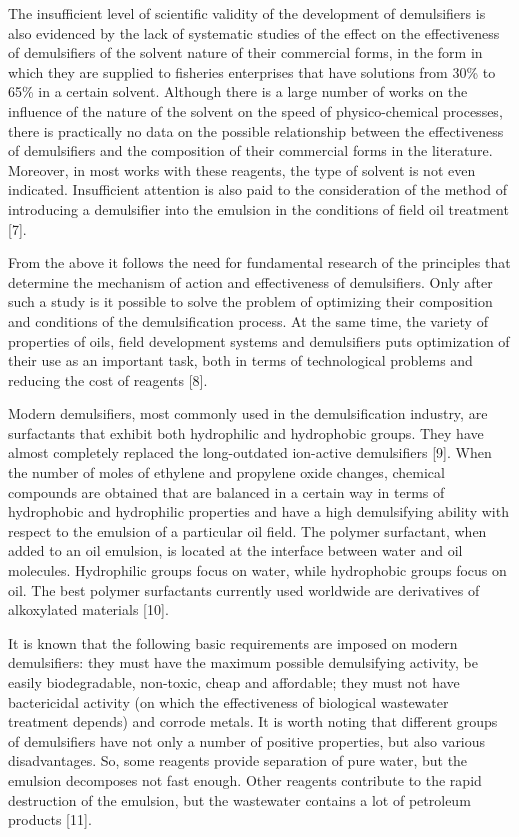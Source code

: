 The insufficient level of scientific validity of the development of
demulsifiers is also evidenced by the lack of systematic studies of the
effect on the effectiveness of demulsifiers of the solvent nature of
their commercial forms, in the form in which they are supplied to
fisheries enterprises that have solutions from 30\% to 65\% in a certain
solvent. Although there is a large number of works on the influence of
the nature of the solvent on the speed of physico-chemical processes,
there is practically no data on the possible relationship between the
effectiveness of demulsifiers and the composition of their commercial
forms in the literature. Moreover, in most works with these reagents,
the type of solvent is not even indicated. Insufficient attention is
also paid to the consideration of the method of introducing a
demulsifier into the emulsion in the conditions of field oil treatment
{[}7{]}.

From the above it follows the need for fundamental research of the
principles that determine the mechanism of action and effectiveness of
demulsifiers. Only after such a study is it possible to solve the
problem of optimizing their composition and conditions of the
demulsification process. At the same time, the variety of properties of
oils, field development systems and demulsifiers puts optimization of
their use as an important task, both in terms of technological problems
and reducing the cost of reagents {[}8{]}.

Modern demulsifiers, most commonly used in the demulsification industry,
are surfactants that exhibit both hydrophilic and hydrophobic groups.
They have almost completely replaced the long-outdated ion-active
demulsifiers {[}9{]}. When the number of moles of ethylene and propylene
oxide changes, chemical compounds are obtained that are balanced in a
certain way in terms of hydrophobic and hydrophilic properties and have
a high demulsifying ability with respect to the emulsion of a particular
oil field. The polymer surfactant, when added to an oil emulsion, is
located at the interface between water and oil molecules. Hydrophilic
groups focus on water, while hydrophobic groups focus on oil. The best
polymer surfactants currently used worldwide are derivatives of
alkoxylated materials {[}10{]}.

It is known that the following basic requirements are imposed on modern
demulsifiers: they must have the maximum possible demulsifying activity,
be easily biodegradable, non-toxic, cheap and affordable; they must not
have bactericidal activity (on which the effectiveness of biological
wastewater treatment depends) and corrode metals. It is worth noting
that different groups of demulsifiers have not only a number of positive
properties, but also various disadvantages. So, some reagents provide
separation of pure water, but the emulsion decomposes not fast enough.
Other reagents contribute to the rapid destruction of the emulsion, but
the wastewater contains a lot of petroleum products {[}11{]}.

